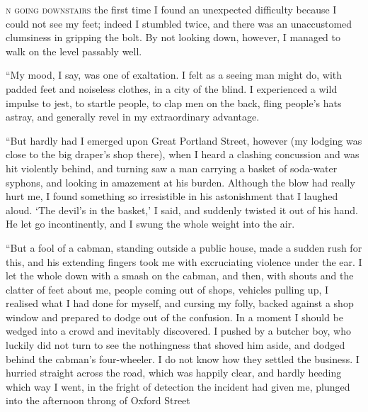 \label{ch:21}
\begin{ChapterStart}
\vspace*{2\nbs}

\vspace{1.5\nbs}
\end{ChapterStart}

\kern-4pt\textsc{n going downstairs} the first time I found an unexpected difficulty because I could not see my feet; indeed I stumbled twice, and there was an unaccustomed clumsiness in gripping the bolt. By not looking down, however, I managed to walk on the level passably well.

“My mood, I say, was one of exaltation. I felt as a seeing man might do, with padded feet and noiseless clothes, in a city of the blind. I experienced a wild impulse to jest, to startle people, to clap men on the back, fling people’s hats astray, and generally revel in my extraordinary advantage.

“But hardly had I emerged upon Great Portland Street, however (my lodging was close to the big draper’s shop there), when I heard a clashing concussion and was hit violently behind, and turning saw a man carrying a basket of soda-water syphons, and looking in amazement at his burden. Although the blow had really hurt me, I found something so irresistible in his astonishment that I laughed aloud. ‘The devil’s in the basket,’ I said, and suddenly twisted it out of his hand. He let go incontinently, and I swung the whole weight into the air.

“But a fool of a cabman, standing outside a public house, made a sudden rush for this, and his extending fingers took me with excruciating violence under the ear. I let the whole down with a smash on the cabman, and then, with shouts and the clatter of feet about me, people coming out of shops, vehicles pulling up, I realised what I had done for myself, and cursing my folly, backed against a shop window and prepared to dodge out of the confusion. In a moment I should be wedged into a crowd and inevitably discovered. I pushed by a butcher boy, who luckily did not turn to see the nothingness that shoved him aside, and dodged behind the cabman’s four-wheeler. I do not know how they settled the business. I hurried straight across the road, which was happily clear, and hardly heeding which way I went, in the fright of detection the incident had given me, plunged into the afternoon throng of Oxford Street


